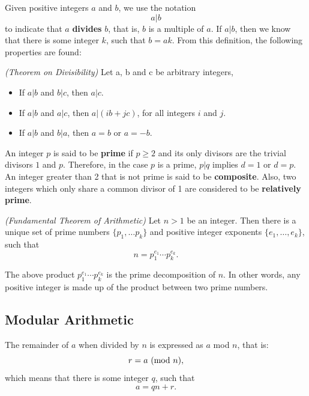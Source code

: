 Given positive integers $a$ and $b$, we use the notation 
\begin{equation}
a|b
\end{equation}
to indicate that $a$ \textbf{divides} $b$, that is, $b$ is a multiple of $a$. If $a|b$, then we know that there is some integer $k$, such that $b=ak$. From this definition, the following properties are found:

\begin{theorem}
  \emph{(Theorem on Divisibility)} Let a, b and c be arbitrary integers,
  \begin{itemize}
  \item If $a|b$ and $b|c$, then $a|c$.
  \item If $a|b$ and $a|c$, then $a|(ib+jc)$, for all integers $i$ and $j$.
  \item If $a|b$ and $b|a$, then $a=b$ or $a= -b$.
  \end{itemize}
\end{theorem}

An integer $p$ is said to be \textbf{prime} if $p\geq 2$ and its only divisors are the trivial divisors $1$ and $p$. Therefore, in the case $p$ is a prime, $p|q$ implies $d=1$ or $d=p$. An integer greater than 2 that is not prime is said to be \textbf{composite}. Also, two integers which only share a common divisor of 1 are considered to be \textbf{relatively prime}.

\begin{theorem}
\emph{(Fundamental Theorem of Arithmetic)}
Let $n > 1$ be an integer. Then there is a unique set of prime numbers $\{p_{1}, \dots p_{k}\}$ and positive integer exponents  $\{e_{1}, \dots , e_{k}\}$, such that
\begin{equation}
n = p_{1}^{e_{1}} \cdots p_{k}^{e_{k}}.
\end{equation}
\end{theorem}

The above product $p_{1}^{e_{1}} \cdots p_{k}^{e_{k}}$ is the prime decomposition of $n$. In other words, any positive integer is made up of the product between two prime numbers.   

\subsection{Modular Arithmetic}

The remainder of $a$ when divided by $n$ is expressed as $a$ mod $n$, that is:
\begin{equation}
  r = a \ (\text{mod}\ n),
\end{equation}
\noindent which means that there is some integer $q$, such that
\begin{equation}
  a = qn + r.
\end{equation}

